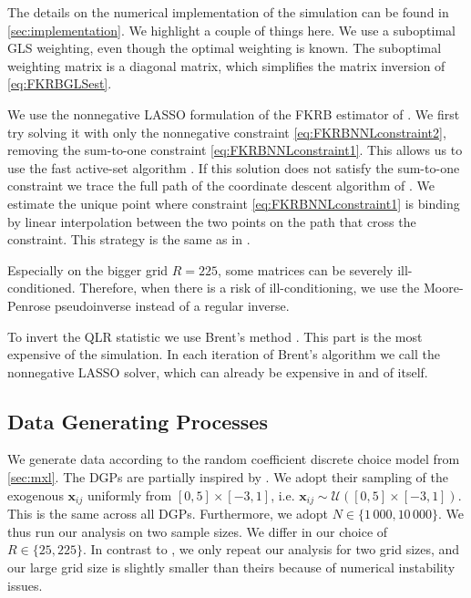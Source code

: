 The details on the numerical implementation of the simulation can be found in \cref{sec:implementation}.
We highlight a couple of things here.
We use a suboptimal GLS weighting, even though the optimal weighting is known.
The suboptimal weighting matrix is a diagonal matrix, which simplifies the matrix inversion of \cref{eq:FKRBGLSest}.

We use the nonnegative LASSO formulation of the FKRB estimator of \citet{HeissHetzeneckerOsterhaus2022}.
We first try solving it with only the nonnegative constraint \eqref{eq:FKRBNNLconstraint2}, removing the sum-to-one constraint \eqref{eq:FKRBNNLconstraint1}.
This allows us to use the fast active-set algorithm \citep{LawsonHanson1995}.
If this solution does not satisfy the sum-to-one constraint we trace the full path of the coordinate descent algorithm of \citet{FriedmanHastieTibshirani2010}.
We estimate the unique point where constraint \eqref{eq:FKRBNNLconstraint1} is binding by linear interpolation between the two points on the path that cross the constraint.
This strategy is the same as in \citet{Brand2023}.

Especially on the bigger grid $R=225$, some matrices can be severely ill-conditioned.
Therefore, when there is a risk of ill-conditioning, we use the Moore-Penrose pseudoinverse instead of a regular inverse.

To invert the QLR statistic we use Brent's method \citep{Brent1973}.
This part is the most expensive of the simulation.
In each iteration of Brent's algorithm we call the nonnegative LASSO solver, which can already be expensive in and of itself.

\subsection{Data Generating Processes}
\label{sec:dgp}
We generate data according to the random coefficient discrete choice model from \cref{sec:mxl}.
The DGPs are partially inspired by \citet{HeissHetzeneckerOsterhaus2022}.
We adopt their sampling of the exogenous $\bm{x}_{ij}$ uniformly from $[0,5]\times[-3,1]$, i.e. $\bm{x}_{ij} \sim \mathcal{U}([0,5]\times[-3,1])$.
This is the same across all DGPs.
Furthermore, we adopt $N \in \{1\,000, 10\,000\}$.
We thus run our analysis on two sample sizes.
We differ in our choice of $R \in \{25, 225\}$.
In contrast to \citeauthor{HeissHetzeneckerOsterhaus2022}, we only repeat our analysis for two grid sizes, and our large grid size is slightly smaller than theirs because of numerical instability issues.

